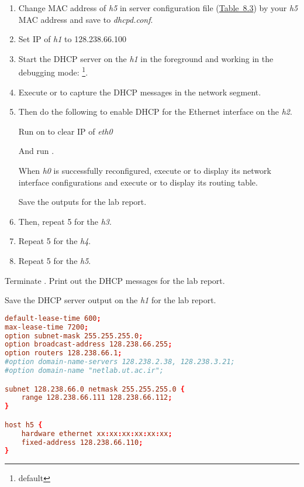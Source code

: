 \documentclass{../UTNetLab}
\begin{document}
    \begin{enumerate}
        \item Change MAC address of \textit{h5} in server configuration file (\hyperref[tab:8.3]{Table~8.3}) by your \textit{h5} MAC address and save to \textit{dhcpd.conf}.

        \item Set IP of \textit{h1} to {128.238.66.100}

        \item Start the DHCP server on the \textit{h1} in the foreground and working in the debugging mode: \footnote{default }.

        \item Execute  or  to capture the DHCP messages in the network segment.

        \item Then do the following to enable DHCP for the Ethernet interface on the \textit{h2}.

        Run  on  to clear IP of \textit{eth0}

        And run .

        When \textit{h0} is successfully reconfigured, execute  or  to display its
        network interface configurations and execute  or  to display its routing table.

        Save the outputs for the lab report.

        \item Then, repeat 5 for the \textit{h3}.

        \item Repeat 5 for the \textit{h4}.

        \item Repeat 5 for the \textit{h5}.
    \end{enumerate}

    Terminate .
    Print out the DHCP messages for the lab report.

    Save the DHCP server output on the \textit{h1} for the lab report.

    \begin{lstlisting}[language={conf}, caption={A DHCP server configuration file (Table~8.3)\label{tab:8.3}},emph={xx}]
default-lease-time 600;
max-lease-time 7200;
option subnet-mask 255.255.255.0;
option broadcast-address 128.238.66.255;
option routers 128.238.66.1;
#option domain-name-servers 128.238.2.38, 128.238.3.21;
#option domain-name "netlab.ut.ac.ir";

subnet 128.238.66.0 netmask 255.255.255.0 {
    range 128.238.66.111 128.238.66.112;
}

host h5 {
    hardware ethernet xx:xx:xx:xx:xx:xx;
    fixed-address 128.238.66.110;
}
    \end{lstlisting}
\end{document}
